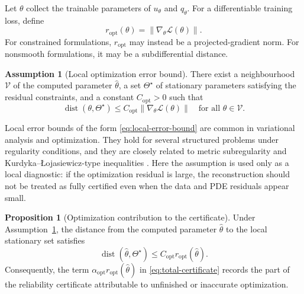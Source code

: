 \documentclass{article}
\numberwithin{equation}{section}
\DeclareMathOperator{\dist}{dist}
\theoremstyle{definition}
\newtheorem{assumption}{Assumption}
\newtheorem{proposition}{Proposition}
\begin{document}
Let \(\theta\) collect the trainable parameters of \(u_\theta\) and \(q_\theta\). For a differentiable training loss, define
\begin{equation}
r_{\mathrm{opt}}(\theta)
=
\|\nabla_\theta\mathcal L(\theta)\|.
\label{eq:opt-residual-repeat}
\end{equation}
For constrained formulations, \(r_{\mathrm{opt}}\) may instead be a projected-gradient norm. For nonsmooth formulations, it may be a subdifferential distance.

\begin{assumption}[Local optimization error bound]
\label{ass:local-error-bound}
There exist a neighbourhood \(\mathcal V\) of the computed parameter \(\widehat\theta\), a set \(\Theta^\star\) of stationary parameters satisfying the residual constraints, and a constant \(C_{\mathrm{opt}}>0\) such that
\begin{equation}
\dist(\theta,\Theta^\star)
\le
C_{\mathrm{opt}}\|\nabla_\theta\mathcal L(\theta)\|
\quad
\text{for all } \theta\in\mathcal V .
\label{eq:local-error-bound}
\end{equation}
\end{assumption}

Local error bounds of the form \eqref{eq:local-error-bound} are common in variational analysis and optimization. They hold for several structured problems under regularity conditions, and they are closely related to metric subregularity and Kurdyka--{\L}ojasiewicz-type inequalities \cite{LuoTseng1993,BolteSabachTeboulle2014,RockafellarWets1998}. Here the assumption is used only as a local diagnostic: if the optimization residual is large, the reconstruction should not be treated as fully certified even when the data and PDE residuals appear small.

\begin{proposition}[Optimization contribution to the certificate]
\label{prop:optimization-contribution}
Under Assumption~\ref{ass:local-error-bound}, the distance from the computed parameter \(\widehat\theta\) to the local stationary set satisfies
\begin{equation}
\dist(\widehat\theta,\Theta^\star)
\le
C_{\mathrm{opt}} r_{\mathrm{opt}}(\widehat\theta).
\label{eq:opt-distance-bound}
\end{equation}
Consequently, the term \(\alpha_{\mathrm{opt}}r_{\mathrm{opt}}(\widehat\theta)\) in \eqref{eq:total-certificate} records the part of the reliability certificate attributable to unfinished or inaccurate optimization.
\end{proposition}
\end{document}
